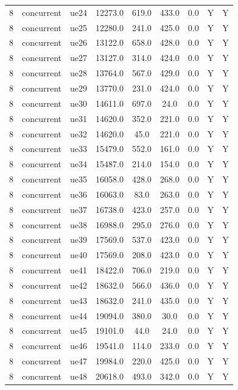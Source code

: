 \begin{table}[ht]
\begin{tabular}{|c|c|c|c|c|c|c|c|c|}
8 & concurrent & ue24 & 12273.0 & 619.0 & 433.0 & 0.0 & Y & Y \\
8 & concurrent & ue25 & 12280.0 & 241.0 & 425.0 & 0.0 & Y & Y \\
8 & concurrent & ue26 & 13122.0 & 658.0 & 428.0 & 0.0 & Y & Y \\
8 & concurrent & ue27 & 13127.0 & 314.0 & 424.0 & 0.0 & Y & Y \\
8 & concurrent & ue28 & 13764.0 & 567.0 & 429.0 & 0.0 & Y & Y \\
8 & concurrent & ue29 & 13770.0 & 231.0 & 424.0 & 0.0 & Y & Y \\
8 & concurrent & ue30 & 14611.0 & 697.0 & 24.0 & 0.0 & Y & Y \\
8 & concurrent & ue31 & 14620.0 & 352.0 & 221.0 & 0.0 & Y & Y \\
8 & concurrent & ue32 & 14620.0 & 45.0 & 221.0 & 0.0 & Y & Y \\
8 & concurrent & ue33 & 15479.0 & 552.0 & 161.0 & 0.0 & Y & Y \\
8 & concurrent & ue34 & 15487.0 & 214.0 & 154.0 & 0.0 & Y & Y \\
8 & concurrent & ue35 & 16058.0 & 428.0 & 268.0 & 0.0 & Y & Y \\
8 & concurrent & ue36 & 16063.0 & 83.0 & 263.0 & 0.0 & Y & Y \\
8 & concurrent & ue37 & 16738.0 & 423.0 & 257.0 & 0.0 & Y & Y \\
8 & concurrent & ue38 & 16988.0 & 295.0 & 276.0 & 0.0 & Y & Y \\
8 & concurrent & ue39 & 17569.0 & 537.0 & 423.0 & 0.0 & Y & Y \\
8 & concurrent & ue40 & 17569.0 & 208.0 & 423.0 & 0.0 & Y & Y \\
8 & concurrent & ue41 & 18422.0 & 706.0 & 219.0 & 0.0 & Y & Y \\
8 & concurrent & ue42 & 18632.0 & 566.0 & 436.0 & 0.0 & Y & Y \\
8 & concurrent & ue43 & 18632.0 & 241.0 & 435.0 & 0.0 & Y & Y \\
8 & concurrent & ue44 & 19094.0 & 380.0 & 30.0 & 0.0 & Y & Y \\
8 & concurrent & ue45 & 19101.0 & 44.0 & 24.0 & 0.0 & Y & Y \\
8 & concurrent & ue46 & 19541.0 & 114.0 & 233.0 & 0.0 & Y & Y \\
8 & concurrent & ue47 & 19984.0 & 220.0 & 425.0 & 0.0 & Y & Y \\
8 & concurrent & ue48 & 20618.0 & 493.0 & 342.0 & 0.0 & Y & Y \\

\end{tabular}
\end{table}
